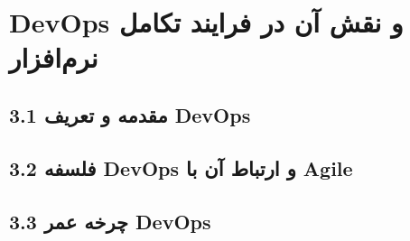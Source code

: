 \chapter{DevOps و نقش آن در فرایند تکامل نرم‌افزار}

\section{3.1 مقدمه و تعریف DevOps}
\label{sec:ch3-Definition}


\section{3.2 فلسفه DevOps و ارتباط آن با Agile}
\label{sec:ch3-DevOpsVSAgile}


\section{3.3 چرخه عمر DevOps}
\label{sec:ch3-LifeCicle}


